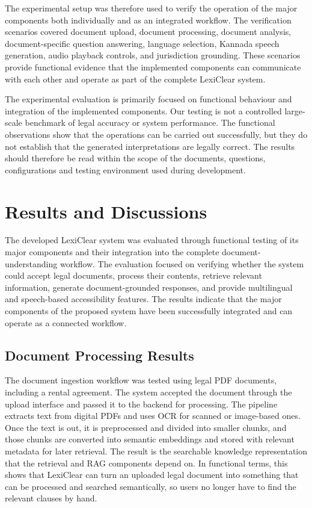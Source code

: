 \documentclass[12pt,a4paper,oneside]{report}
\begin{document}
The experimental setup was therefore used to verify the operation of the
major components both individually and as an integrated workflow. The
verification scenarios covered document upload, document processing, document
analysis, document-specific question answering, language selection, Kannada
speech generation, audio playback controls, and jurisdiction grounding. These
scenarios provide functional evidence that the implemented components can
communicate with each other and operate as part of the complete LexiClear
system.

The experimental evaluation is primarily focused on functional behaviour and
integration of the implemented components. Our testing is not a controlled large-scale benchmark of legal accuracy or system performance. The functional observations show that the operations can be carried out successfully, but they do not establish that the generated interpretations are legally correct. The results should therefore be read within the scope of the documents, questions, configurations and testing environment used during development.

\section{Results and Discussions}

The developed LexiClear system was evaluated through functional testing of its major components and their integration into the complete document-understanding workflow. The evaluation focused on verifying whether the system could accept legal documents, process their contents, retrieve relevant information, generate document-grounded responses, and provide multilingual and speech-based accessibility features. The results indicate that the major components of the proposed system have been successfully integrated and can operate as a connected workflow.

\subsection{Document Processing Results}
The document ingestion workflow was tested using legal PDF documents, including a rental agreement. The system accepted the document through the upload interface and passed it to the backend for processing. The pipeline extracts text from digital PDFs and uses OCR for scanned or image-based ones. Once the text is out, it is preprocessed and divided into smaller chunks, and those chunks are converted into semantic embeddings and stored with relevant metadata for later retrieval. The result is the searchable knowledge representation that the retrieval and RAG components depend on. In functional terms, this shows that LexiClear can turn an uploaded legal document into something that can be processed and searched semantically, so users no longer have to find the relevant clauses by hand.
\end{document}
